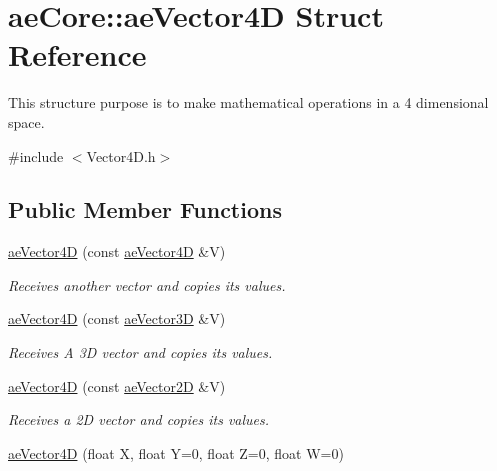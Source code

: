 \hypertarget{structae_core_1_1ae_vector4_d}{}\section{ae\+Core\+:\+:ae\+Vector4D Struct Reference}
\label{structae_core_1_1ae_vector4_d}


This structure purpose is to make mathematical operations in a 4 dimensional space.  




{\ttfamily \#include $<$Vector4\+D.\+h$>$}

\subsection*{Public Member Functions}
\begin{DoxyCompactItemize}
\item 
\hyperlink{structae_core_1_1ae_vector4_d_ae143b4d6728f11910c3e5672907c5471}{ae\+Vector4D} (const \hyperlink{structae_core_1_1ae_vector4_d}{ae\+Vector4D} \&V)\hypertarget{structae_core_1_1ae_vector4_d_ae143b4d6728f11910c3e5672907c5471}{}\label{structae_core_1_1ae_vector4_d_ae143b4d6728f11910c3e5672907c5471}

\begin{DoxyCompactList}\small\item\em Receives another vector and copies its values. \end{DoxyCompactList}\item 
\hyperlink{structae_core_1_1ae_vector4_d_a0eca23af51755356c7099ad1e9d1632e}{ae\+Vector4D} (const \hyperlink{structae_core_1_1ae_vector3_d}{ae\+Vector3D} \&V)\hypertarget{structae_core_1_1ae_vector4_d_a0eca23af51755356c7099ad1e9d1632e}{}\label{structae_core_1_1ae_vector4_d_a0eca23af51755356c7099ad1e9d1632e}

\begin{DoxyCompactList}\small\item\em Receives A 3D vector and copies its values. \end{DoxyCompactList}\item 
\hyperlink{structae_core_1_1ae_vector4_d_adb00030119cd342780d4a417f316f0eb}{ae\+Vector4D} (const \hyperlink{structae_core_1_1ae_vector2_d}{ae\+Vector2D} \&V)\hypertarget{structae_core_1_1ae_vector4_d_adb00030119cd342780d4a417f316f0eb}{}\label{structae_core_1_1ae_vector4_d_adb00030119cd342780d4a417f316f0eb}

\begin{DoxyCompactList}\small\item\em Receives a 2D vector and copies its values. \end{DoxyCompactList}\item 
\hyperlink{structae_core_1_1ae_vector4_d_ab2dc0bf858e39bc5cce83f883a8077b5}{ae\+Vector4D} (float X, float Y=0, float Z=0, float W=0)\hypertarget{structae_core_1_1ae_vector4_d_ab2dc0bf858e39bc5cce83f883a8077b5}{}\label{structae_core_1_1ae_vector4_d_ab2dc0bf858e39bc5cce83f883a8077b5}


\end{DoxyCompactItemize}
